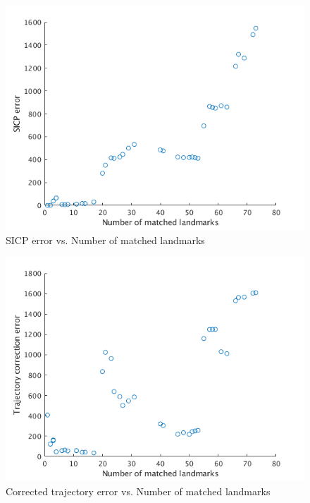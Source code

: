 \documentclass[letterpaper, 10 pt, conference]{ieeeconf}  %
\begin{document}
\begin{figure}[thpb]
  \centering
  \includegraphics[width=\linewidth]{sicp_err.png}
  \caption{SICP error vs. Number of matched landmarks}
  \label{fig:sicperr}
\end{figure}

\begin{figure}[thpb]
  \centering
  \includegraphics[width=\linewidth]{traj_err.png}
  \caption{Corrected trajectory error vs. Number of matched landmarks}
  \label{fig:trajerr}
\end{figure}
\end{document}

